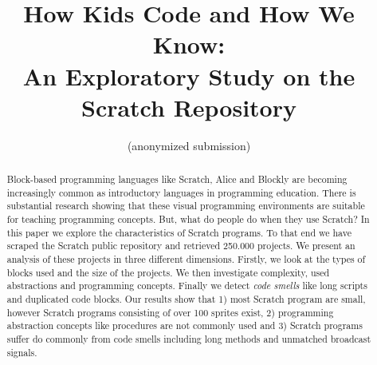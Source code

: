 \documentclass{sig-alternate}
\begin{document}
%

\title{How Kids Code and How We Know:\\An Exploratory Study on the Scratch Repository }

\author{
\alignauthor
(anonymized submission)
}


\maketitle
\begin{abstract}
Block-based programming languages like Scratch, Alice and Blockly are becoming increasingly common as introductory languages in programming education. There is substantial research showing that these visual programming environments are suitable for teaching programming concepts. But, what do people do when they use Scratch? In this paper we explore the characteristics of Scratch programs. To that end we have scraped the Scratch public repository and retrieved 250.000 projects. We present an analysis of these projects in three different dimensions. Firstly, we look at the types of blocks used and the size of the projects. We then investigate complexity, used abstractions and programming concepts. Finally we detect \emph{code smells} like long scripts and duplicated code blocks. Our results show that 1) most Scratch program are small, however Scratch programs consisting of over 100 sprites exist, 2) programming abstraction concepts like procedures are not commonly used and 3) Scratch programs suffer do commonly from code smells including long methods and unmatched broadcast signals.
\end{abstract}
\end{document}
